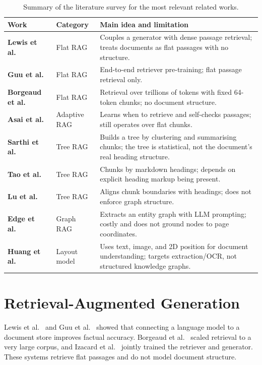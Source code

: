 \documentclass[12pt,a4paper,twoside,openright]{report}
\begin{document}
\begin{table}[!htbp]
\centering
\caption{Summary of the literature survey for the most relevant related works.}
\label{tab:litsurvey}
\renewcommand{\arraystretch}{1.3}
{\small
\begin{tabularx}{\textwidth}{@{} >{\bfseries}p{2.5cm} p{3.0cm} X @{}}
\toprule
Work & Category & Main idea and limitation \\ \midrule
Lewis et al.~\cite{lewis2020rag} & Flat RAG & Couples a generator with dense passage
retrieval; treats documents as flat passages with no structure. \\
Guu et al.~\cite{guu2020realm} & Flat RAG & End-to-end retriever pre-training; flat
passage retrieval only. \\
Borgeaud et al.~\cite{borgeaud2022retro} & Flat RAG & Retrieval over trillions of
tokens with fixed 64-token chunks; no document structure. \\
Asai et al.~\cite{asai2024selfrag} & Adaptive RAG & Learns when to retrieve and
self-checks passages; still operates over flat chunks. \\
Sarthi et al.~\cite{sarthi2024raptor} & Tree RAG & Builds a tree by clustering and
summarising chunks; the tree is statistical, not the document's real heading structure. \\
Tao et al.~\cite{tao2025treerag} & Tree RAG & Chunks by markdown headings; depends on
explicit heading markup being present. \\
Lu et al.~\cite{lu2026hichunk} & Tree RAG & Aligns chunk boundaries with headings;
does not enforce graph structure. \\
Edge et al.~\cite{edge2024graphrag} & Graph RAG & Extracts an entity graph with LLM
prompting; costly and does not ground nodes to page coordinates. \\
Huang et al.~\cite{huang2022layoutlmv3} & Layout model & Uses text, image, and 2D
position for document understanding; targets extraction/OCR, not structured knowledge
graphs. \\ \bottomrule
\end{tabularx}}
\end{table}

\section{Retrieval-Augmented Generation}
Lewis et al.~\cite{lewis2020rag} and Guu et al.~\cite{guu2020realm} showed that
connecting a language model to a document store improves factual accuracy. Borgeaud et
al.~\cite{borgeaud2022retro} scaled retrieval to a very large corpus, and Izacard et
al.~\cite{izacard2023atlas} jointly trained the retriever and generator. These systems
retrieve flat passages and do not model document structure.
\end{document}
